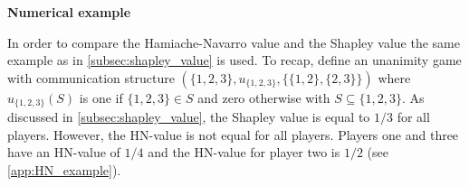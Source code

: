 \textbf{Numerical example}

In order to compare the Hamiache-Navarro value and the Shapley value the same example as in \cref{subsec:shapley_value}
is used. To recap, define an unanimity game with communication structure $(\{1, 2, 3\}, u_{\{1, 2, 3\}}, \{\{1, 2\}, \{2, 3\}\})$
where $u_{\{1, 2, 3\}}(S)$ is one if $\{1, 2, 3\} \in S$ and zero otherwise with $S \subseteq \{1, 2, 3\}$. As discussed
in \cref{subsec:shapley_value}, the Shapley value is equal to $1/3$ for all players. However, the HN-value is not equal
for all players. Players one and three have an HN-value of $1/4$ and the HN-value for player two is $1/2$
(see \cref{app:HN_example}).\cite{hamiache_associated_2020}
